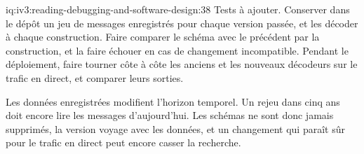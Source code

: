 \begin{solution}{iq:iv3:reading-debugging-and-software-design:38}
Tests à ajouter. Conserver dans le dépôt un jeu de messages enregistrés pour chaque version passée, et les décoder à chaque construction. Faire comparer le schéma avec le précédent par la construction, et la faire échouer en cas de changement incompatible. Pendant le déploiement, faire tourner côte à côte les anciens et les nouveaux décodeurs sur le trafic en direct, et comparer leurs sorties.

Les données enregistrées modifient l'horizon temporel. Un rejeu dans cinq ans doit encore lire les messages d'aujourd'hui. Les schémas ne sont donc jamais supprimés, la version voyage avec les données, et un changement qui paraît sûr pour le trafic en direct peut encore casser la recherche.


\end{solution}

